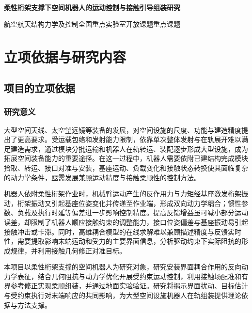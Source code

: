 \documentclass[UTF8,a4paper,zihao=-4,fontset=fandol]{ctexart}
\newcommand{\rev}[1]{{\color{red}#1}}
\begin{document}
\begin{center}
 {\bfseries 柔性桁架支撑下空间机器人的运动控制与接触引导组装研究\par
\par}
 \vspace{0.55em}
 {航空航天结构力学及控制全国重点实验室开放课题\quad 重点课题}
\end{center}
\vspace{0.35em}

\section{立项依据与研究内容}

\subsection{项目的立项依据}

\subsubsection{研究意义}

大型空间天线、太空望远镜等装备的发展，对空间设施的尺度、功能与建造精度提出了更高要求。受运载包络和发射能力限制，依靠单次整体发射与在轨展开难以满足建造需求，通过模块分批运输\rev{和}机器人在轨转运\rev{、}装配逐步形成大型设施，成为拓展空间装备能力的重要途径\cite{hu2025,wu2024}。在这一过程中，机器人需要依附已建结构完成模块拾取、转运、接口对准\rev{与}安装\rev{，基座}运动、\rev{负载}变化\rev{和}接触状态转换使\rev{其}面临复杂的动力学条件，\rev{亟需发展}兼顾运动精度与接触柔顺性的控制方法。

机器人依附柔性桁架作业时，机械臂运动产生的反作用力与力矩经基座\rev{激发}桁架振动，桁架振动又引起基座\rev{位姿}变化并传递至作业端，\rev{形成双向动力学耦合}；惯性参数、负载及执行时延等偏差进一步\rev{影响}控制\rev{精度}。提高反馈增益\rev{虽可}减小\rev{部分}运动误差，\rev{却}限制了机器人顺应接触约束的调整能力，\rev{接口}位姿偏差与\rev{基座}振动易引起接触\rev{冲击或}卡滞。\rev{同时}，高维\rev{耦合}模型\rev{的}在线求解难以兼顾描述精度与反馈实时性，需要提取影响末端运动\rev{和受力}的主要\rev{界面}信息，\rev{分析驱动约束下实际阻抗}的\rev{形成规律}，并\rev{利用}接触\rev{几何修正对准目标}。

本项目以柔性桁架支撑的空间机器人为研究对象，研究\rev{安装界面耦合作用}的\rev{反向}动力学表征，结合几何阻抗与动力学优化开展\rev{受约束}运动控制，利用接触\rev{场配准}和\rev{有界参考修正}实现柔顺组装，并通过地面\rev{实验}验证。研究\rev{将揭示界面扰动、目标估计}与\rev{受约束执行对末端响应的}共同\rev{影响}，为大型空间\rev{设施}机器人在轨组装提供理论依据与\rev{方法}支撑。
\end{document}
